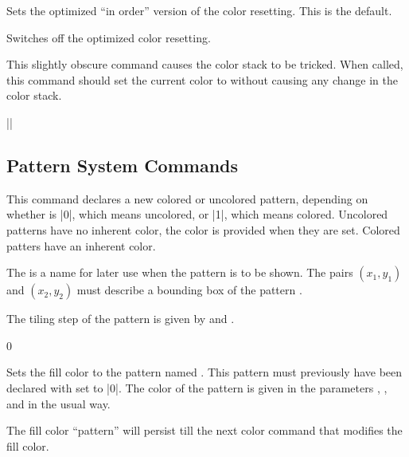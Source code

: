 \begin{command}{\pgfsys@color@reset@inordertrue}
    Sets the optimized ``in order'' version of the color resetting. This is the
    default.
\end{command}

\begin{command}{\pgfsys@color@reset@inorderfalse}
    Switches off the optimized color resetting.
\end{command}

\begin{command}{\pgfsys@color@unstacked{}}
    This slightly obscure command causes the color stack to be tricked. When
    called, this command should set the current color to 
    without causing any change in the color stack.

    \example ||
\end{command}


\subsection{Pattern System Commands}

\begin{command}{\pgfsys@declarepattern
}
    This command declares a new colored or uncolored pattern, depending on
    whether  is |0|, which means uncolored, or |1|, which means
    colored. Uncolored patterns have no inherent color, the color is provided
    when they are set. Colored patters have an inherent color.

    The  is a name for later use when the pattern is to be shown.
    The pairs $(x_1,y_1)$ and $(x_2,y_2)$ must describe a bounding box of the
    pattern .

    The tiling step of the pattern is given by  and .

    \example
\begin{codeexample}
{\pgfsys@moveto{0pt}{0pt}\pgfsys@lineto{0pt}{3pt}\pgfsys@stroke}
{0}
\end{codeexample}
\end{command}

\begin{command}{\pgfsys@setpatternuncolored{}}
    Sets the fill color to the pattern named . This pattern must
    previously have been declared with  set to |0|. The color of the
    pattern is given in the parameters , , and
     in the usual way.

    The fill color ``pattern'' will persist till the next color command that
    modifies the fill color.
\end{command}

